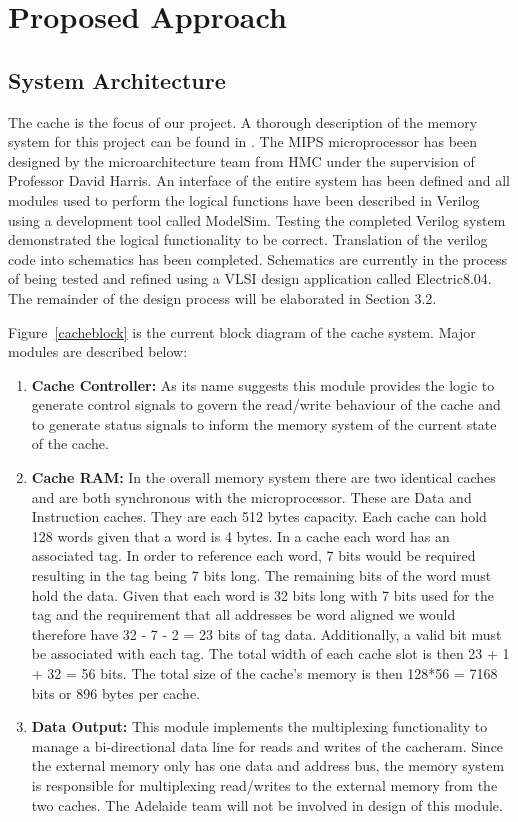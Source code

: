 \section{Proposed Approach}

\subsection{System Architecture}

The cache is the focus of our project. A thorough description of
the memory system for this project can be found in
\cite{hmcmemsys}. The MIPS microprocessor has been designed by the
microarchitecture team from HMC under the supervision of Professor David
Harris. An interface of the entire system has been defined and all modules used to perform
the logical functions have been described in Verilog using a development tool
called ModelSim. Testing the completed Verilog system demonstrated the logical
functionality to be correct. Translation of the verilog code into schematics
has been completed. Schematics are currently in the process of being
tested and refined using a VLSI design application called Electric8.04. The
remainder of the design process will be elaborated in Section 3.2.

Figure~\ref{cacheblock} is the current block diagram of
the cache system. Major modules are described below:
\begin{enumerate}
\item \textbf{Cache Controller: }As its name suggests this module provides the logic to generate control signals to govern the read/write behaviour of the cache and to generate status signals to inform the memory system of the current state of the cache.
\item \textbf{Cache RAM: }In the overall memory system there are two identical caches and are both synchronous with the microprocessor. These are Data and Instruction caches. They are each 512 bytes capacity. Each cache can hold 128 words given that a word is 4 bytes. In a cache each word has an associated tag. In order to reference each word, 7 bits would be required resulting in the tag being 7 bits long. The remaining bits of the word must hold the data. Given that each word is 32 bits long with 7 bits used for the tag and the requirement that all addresses be word aligned we would therefore have  32 - 7 - 2 = 23 bits of tag data. Additionally, a valid bit must be associated with each tag. The total width of each cache slot is then 23 + 1 + 32 = 56 bits. The total size of the cache's memory is then 128*56 = 7168 bits or 896 bytes per cache.
\item \textbf{Data Output: }This module implements the multiplexing functionality to manage a bi-directional data line for reads and writes of the cacheram. Since the external memory only has one data and address bus, the memory system is responsible for multiplexing read/writes to the external memory from the two caches. The Adelaide team will not be involved in design of this module.
\end{enumerate}


